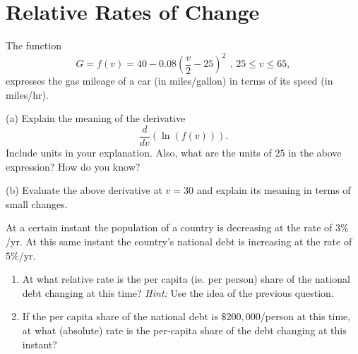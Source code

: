 \documentclass{ximera}
\begin{document}
\section{Relative Rates of Change}

\begin{question}  \label{Qddfdsf4thmm}
The function 
\[ 
      G = f(v) = 40-0.08\left(\frac{v}{2}-25\right)^{2}\, \ , \, 25\leq v\leq 65 ,
\]
expresses the gas mileage of a car (in miles/gallon) in terms of its speed (in miles/hr).

(a) Explain the meaning of the derivative 
\[
     \frac{d}{dv} \left( \ln (f(v)) \right) .
\]
Include units in your explanation. Also, what are the units of $25$ in the above expression? How do you know?

(b) Evaluate the above derivative at $v=30$ and explain its meaning in terms of small changes.

\end{question}

\begin{question} \label{Q34vcvnhh}
At a certain instant the population of a country is decreasing at the rate of $3\%$/yr. At this same instant the country's national debt is increasing at the rate of $5\%$/yr.

\begin{enumerate}
\item At what relative rate is the per capita (ie. per person) share of the national debt changing at this time? \emph{Hint:} Use the idea of the previous question.

\item If the per capita share of the national debt is $\$200,000$/person at this time, at what (absolute) rate is the per-capita share of the debt changing at this instant?

\end{enumerate}
\end{question}
\end{document}
